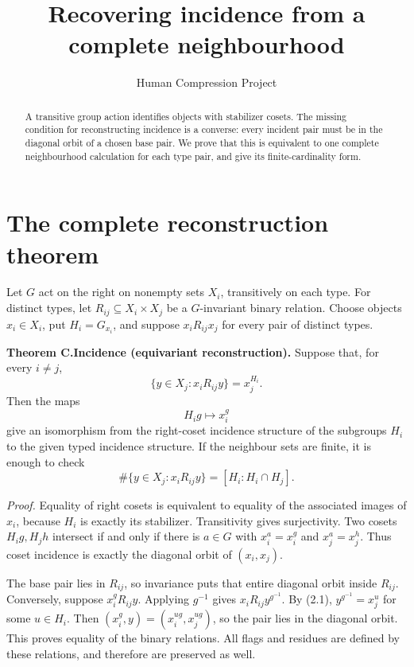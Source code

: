 
\title{Recovering incidence from a complete neighbourhood}
\author{Human Compression Project}\date{}
\maketitle
\begin{abstract}
A transitive group action identifies objects with stabilizer cosets. The missing condition for reconstructing incidence is a converse: every incident pair must be in the diagonal orbit of a chosen base pair. We prove that this is equivalent to one complete neighbourhood calculation for each type pair, and give its finite-cardinality form.
\end{abstract}
\section{The complete reconstruction theorem}
Let \(G\) act on the right on nonempty sets \(X_i\), transitively on
each type. For distinct types, let \(R_{ij}\subseteq X_i\times X_j\) be
a \(G\)-invariant binary relation. Choose objects \(x_i\in X_i\), put
\(H_i=G_{x_i}\), and suppose \(x_i R_{ij}x_j\) for every pair of
distinct types.

\textbf{Theorem C.Incidence (equivariant reconstruction).} Suppose that, for
every \(i\ne j\), \[
 \{y\in X_j:x_iR_{ij}y\}=x_j^{H_i}.
 \tag{2.1}
\] Then the maps \[
 H_i g\longmapsto x_i^g
\] give an isomorphism from the right-coset incidence structure of the
subgroups \(H_i\) to the given typed incidence structure. If the
neighbour sets are finite, it is enough to check \[
 \#\{y\in X_j:x_iR_{ij}y\}
   =[H_i:H_i\cap H_j].
 \tag{2.2}
\]

\emph{Proof.} Equality of right cosets is equivalent to equality of the
associated images of \(x_i\), because \(H_i\) is exactly its stabilizer.
Transitivity gives surjectivity. Two cosets \(H_i g,H_j h\) intersect if
and only if there is \(a\in G\) with \(x_i^a=x_i^g\) and
\(x_j^a=x_j^h\). Thus coset incidence is exactly the diagonal orbit of
\((x_i,x_j)\).

The base pair lies in \(R_{ij}\), so invariance puts that entire
diagonal orbit inside \(R_{ij}\). Conversely, suppose \(x_i^gR_{ij}y\).
Applying \(g^{-1}\) gives \(x_iR_{ij}y^{g^{-1}}\). By (2.1),
\(y^{g^{-1}}=x_j^u\) for some \(u\in H_i\). Then
\((x_i^g,y)=(x_i^{ug},x_j^{ug})\), so the pair lies in the diagonal
orbit. This proves equality of the binary relations. All flags and
residues are defined by these relations, and therefore are preserved as
well.


